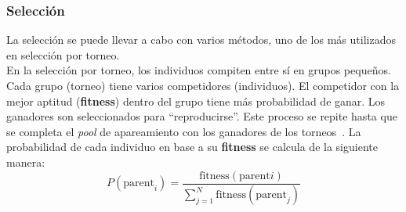 \subsubsection{Selección}
La selección se puede llevar a cabo con varios métodos, uno de los más utilizados en selección por torneo.\\[6pt]
En la selección por torneo, los individuos compiten entre sí en grupos pequeños. Cada grupo (torneo) tiene varios competidores (individuos). El competidor con la mejor aptitud (\textbf{fitness}) dentro del grupo tiene más probabilidad de ganar. Los ganadores son seleccionados para ``reproducirse''. Este proceso se repite hasta que se completa el \textit{pool} de apareamiento con los ganadores de los torneos~\cite{miller_genetic_nodate}. La probabilidad de cada individuo en base a su \textbf{fitness} se calcula de la siguiente manera:
\begin{equation}
    P(\text{parent}_i) = \frac{\text{fitness}(\text{parent}i)}{\sum_{j=1}^{N} \text{fitness}(\text{parent}_j)}
\end{equation}

